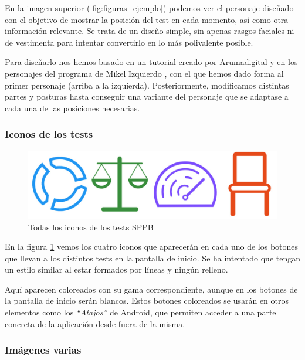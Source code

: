 En la imagen superior (\ref{fig:figuras_ejemplo}) podemos ver el personaje diseñado con el objetivo de mostrar la posición del test en cada momento, así como otra información relevante. Se trata de un diseño simple, sin apenas rasgos faciales ni de vestimenta para intentar convertirlo en lo más polivalente posible. 

Para diseñarlo nos hemos basado en un tutorial creado por Arumadigital \cite{Arumadigital} y en los personajes del programa de Mikel Izquierdo \cite{SPPB_clasificacion}, con el que hemos dado forma al primer personaje (arriba a la izquierda). Posteriormente, modificamos distintas partes y posturas hasta conseguir una variante del personaje que se adaptase a cada una de las posiciones necesarias.

\subsubsection{Iconos de los tests}

\begin{figure}[H]
	\centering
	\includegraphics[scale=0.35]{imagenes/iconos.jpg}
	\caption{Todas los iconos de los tests SPPB\label{fig:todos_iconos}}
\end{figure}

En la figura \ref{fig:todos_iconos} vemos los cuatro iconos que aparecerán en cada uno de los botones que llevan a los distintos tests en la pantalla de inicio. Se ha intentado que tengan un estilo similar al estar formados por líneas y ningún relleno.

Aquí aparecen coloreados con su gama correspondiente, aunque en los botones de la pantalla de inicio serán blancos. Estos botones coloreados se usarán en otros elementos como los \textit{``Atajos''} de Android, que permiten acceder a una parte concreta de la aplicación desde fuera de la misma.

\newpage
\subsubsection{Imágenes varias}

